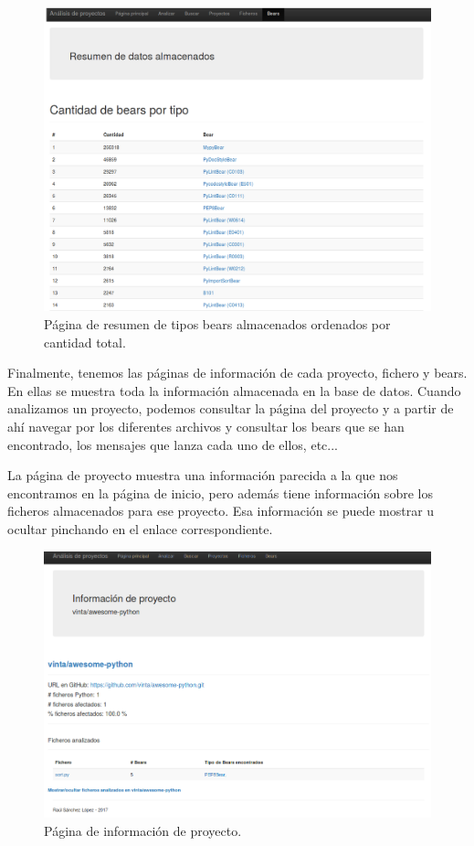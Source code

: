 \documentclass[a4paper, 12pt]{book}
\begin{document}
\begin{figure}[H]
  \centering
  \includegraphics[width=12cm, keepaspectratio]{img/resumenBears}
  \caption{Página de resumen de tipos bears almacenados ordenados por cantidad total.}
  \label{fig:resumenBears}
\end{figure}
Finalmente, tenemos las páginas de información de cada proyecto, fichero y bears. En ellas se muestra toda la información almacenada en la base de datos. Cuando analizamos un proyecto, podemos consultar la página del proyecto y a partir de ahí navegar por los diferentes archivos y consultar los bears que se han encontrado, los mensajes que lanza cada uno de ellos, etc...

La página de proyecto muestra una información parecida a la que nos encontramos en la página de inicio, pero además tiene información sobre los ficheros almacenados para ese proyecto. Esa información se puede mostrar u ocultar pinchando en el enlace correspondiente.
\begin{figure}[H]
  \centering
  \includegraphics[width=12cm, keepaspectratio]{img/infoProyecto}
  \caption{Página de información de proyecto.}
  \label{fig:infoProyecto}
\end{figure}
\end{document}
